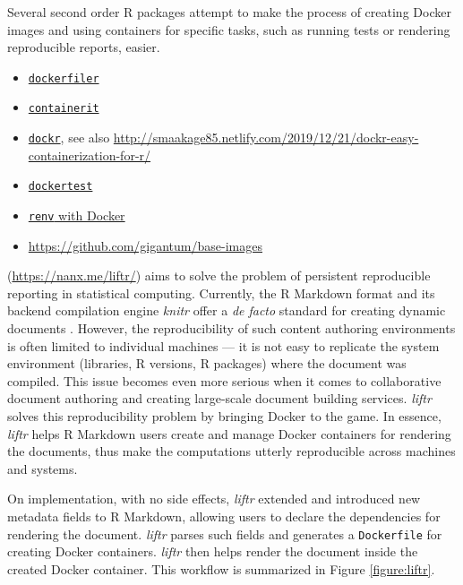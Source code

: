 Several second order R packages attempt to make the process of creating
Docker images and using containers for specific tasks, such as running
tests or rendering reproducible reports, easier.

\begin{itemize}
\tightlist
\item
  \href{https://github.com/ColinFay/dockerfiler/}{\texttt{dockerfiler}}
\item
  \href{https://github.com/o2r-project/containerit/}{\texttt{containerit}}
\item
  \href{https://github.com/smaakage85/dockr}{\texttt{dockr}}, see also
  \url{http://smaakage85.netlify.com/2019/12/21/dockr-easy-containerization-for-r/}
\item
  \href{https://github.com/traitecoevo/dockertest/}{\texttt{dockertest}}
\item
  \href{https://rstudio.github.io/renv/articles/docker.html}{\texttt{renv}
  with Docker}
\item
  \url{https://github.com/gigantum/base-images}
\end{itemize}

\textbf{} (\url{https://nanx.me/liftr/}) \citep{liftr2019}
aims to solve the problem of persistent reproducible reporting in
statistical computing. Currently, the R Markdown format and its backend
compilation engine \emph{knitr} offer a \emph{de facto} standard for
creating dynamic documents \citep{xie2018}. However, the reproducibility
of such content authoring environments is often limited to individual
machines --- it is not easy to replicate the system environment
(libraries, R versions, R packages) where the document was compiled.
This issue becomes even more serious when it comes to collaborative
document authoring and creating large-scale document building services.
\emph{liftr} solves this reproducibility problem by bringing Docker to
the game. In essence, \emph{liftr} helps R Markdown users create and
manage Docker containers for rendering the documents, thus make the
computations utterly reproducible across machines and systems.

On implementation, with no side effects, \emph{liftr} extended and
introduced new metadata fields to R Markdown, allowing users to declare
the dependencies for rendering the document. \emph{liftr} parses such
fields and generates a \texttt{Dockerfile} for creating Docker
containers. \emph{liftr} then helps render the document inside the
created Docker container. This workflow is summarized in Figure
\ref{figure:liftr}.

